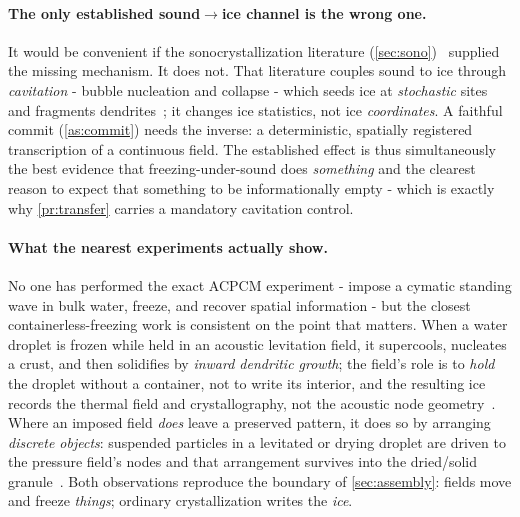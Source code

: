 \documentclass[11pt]{article}
\theoremstyle{definition}
\begin{document}
\paragraph{The only established sound$\rightarrow$ice channel is the wrong one.}
It would be convenient if the sonocrystallization literature
(\cref{sec:sono})~\cite{zhang2021uafmech,delgado2017reviewcontrol} supplied the missing
mechanism. It does not. That literature couples sound to ice through \emph{cavitation} -
bubble nucleation and collapse - which seeds ice at \emph{stochastic} sites and fragments
dendrites~\cite{zhang2021uafmech,saclier2010bubbles}; it changes ice statistics, not ice
\emph{coordinates}. A faithful commit (\cref{as:commit}) needs the inverse: a deterministic,
spatially registered transcription of a continuous field. The established effect is thus
simultaneously the best evidence that freezing-under-sound does \emph{something} and the
clearest reason to expect that something to be informationally empty - which is exactly why
\cref{pr:transfer} carries a mandatory cavitation control.

\paragraph{What the nearest experiments actually show.}
No one has performed the exact ACPCM experiment - impose a cymatic standing wave in bulk
water, freeze, and recover spatial information - but the closest containerless-freezing work
is consistent on the point that matters. When a water droplet is frozen while held in an
acoustic levitation field, it supercools, nucleates a crust, and then solidifies by
\emph{inward dendritic growth}; the field's role is to \emph{hold} the droplet without a
container, not to write its interior, and the resulting ice records the thermal field and
crystallography, not the acoustic node geometry~\cite{biswas2025snowflake}. Where an imposed
field \emph{does} leave a preserved pattern, it does so by arranging \emph{discrete objects}:
suspended particles in a levitated or drying droplet are driven to the pressure field's nodes
and that arrangement survives into the dried/solid granule~\cite{yarin2002drying}. Both
observations reproduce the boundary of \cref{sec:assembly}: fields move and freeze
\emph{things}; ordinary crystallization writes the \emph{ice}.
\end{document}

